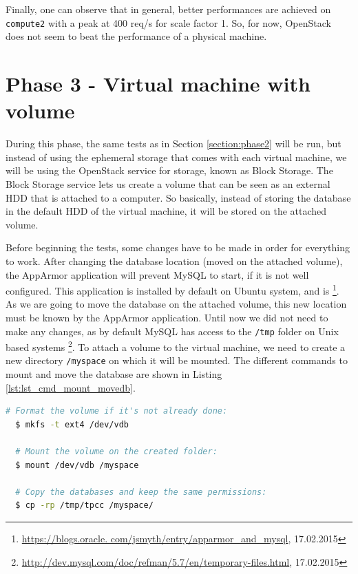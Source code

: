 Finally, one can observe that in general, better performances are achieved on \texttt{compute2} with a peak at 400 req/s for scale factor 1.
So, for now, OpenStack does not seem to beat the performance of a physical machine.






\section{Phase 3 - Virtual machine with volume}

During this phase, the same tests as in Section \ref{section:phase2} will be run, but instead of using the ephemeral storage that comes with each virtual machine, we will be using the OpenStack service for storage, known as Block Storage. 
The Block Storage service lets us create a volume that can be seen as an external HDD that is attached to a computer. 
So basically, instead of storing the database in the default HDD of the virtual machine, it will be stored on the attached volume.

Before beginning the tests, some changes have to be made in order for everything to work. 
After changing the database location (moved on the attached volume), the AppArmor application will prevent MySQL to start, if it is not well configured. 
This application is installed by default on Ubuntu system, and is 
\footnote{\url{https://blogs.oracle.
com/jsmyth/entry/apparmor_and_mysql}, 17.02.2015}. 
As we are going to move the database on the attached volume, this new location must be known by the AppArmor application. 
Until now we did not need to make any changes, as by default MySQL has access to the \texttt{/tmp} folder on Unix based systems
\footnote{\url{http://dev.mysql.com/doc/refman/5.7/en/temporary-files.html}, 17.02.2015}. 
To attach a volume to the virtual machine, we need to create a new directory \texttt{/myspace} on which it will be mounted. 
The different commands to mount and move the database are shown in Listing \ref{lst:lst_cmd_mount_movedb}.

{
\singlespacing
\begin{lstlisting}[frame=single,language=bash,caption={Mount volume and move database},label={lst:lst_cmd_mount_movedb}]
  # Format the volume if it's not already done:
  $ mkfs -t ext4 /dev/vdb

  # Mount the volume on the created folder:
  $ mount /dev/vdb /myspace

  # Copy the databases and keep the same permissions:
  $ cp -rp /tmp/tpcc /myspace/
\end{lstlisting}
}

